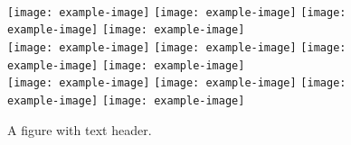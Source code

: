 \begin{figure}[t] \centering
    \\
    \texttt{[image: example-image]}
    \texttt{[image: example-image]}
    \texttt{[image: example-image]}
    \texttt{[image: example-image]}
    \\
    \texttt{[image: example-image]}
    \texttt{[image: example-image]}
    \texttt{[image: example-image]}
    \texttt{[image: example-image]}
    \\
    \texttt{[image: example-image]}
    \texttt{[image: example-image]}
    \texttt{[image: example-image]}
    \texttt{[image: example-image]}
    \\
    \caption{A figure with text header.} 
    \label{fig:teaser}
\end{figure}
